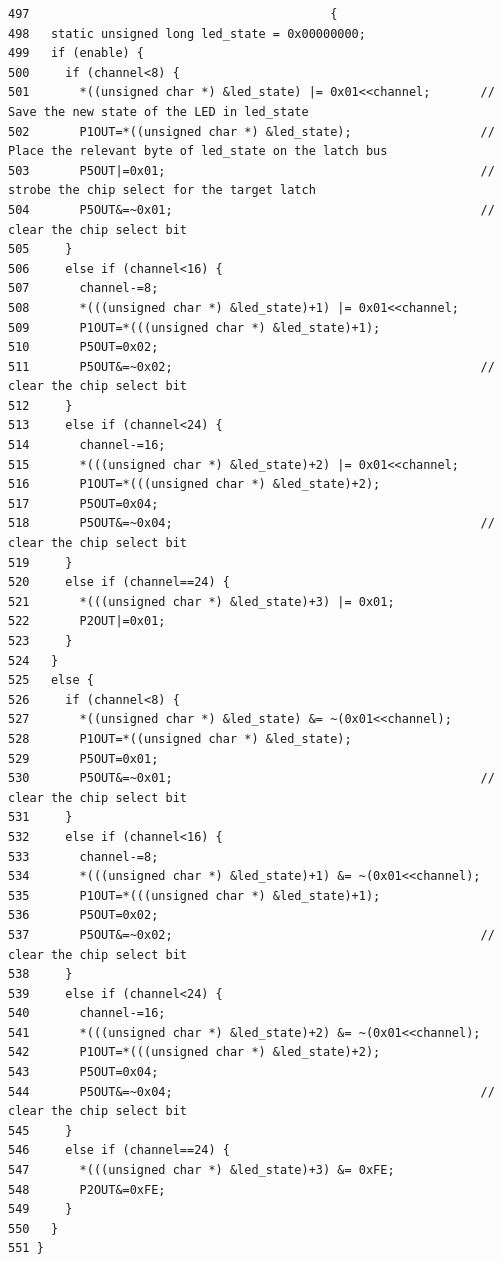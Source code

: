 \footnotesize\begin{verbatim}497                                          {
498   static unsigned long led_state = 0x00000000;
499   if (enable) {
500     if (channel<8) {
501       *((unsigned char *) &led_state) |= 0x01<<channel;       // Save the new state of the LED in led_state
502       P1OUT=*((unsigned char *) &led_state);                  // Place the relevant byte of led_state on the latch bus 
503       P5OUT|=0x01;                                            // strobe the chip select for the target latch
504       P5OUT&=~0x01;                                           // clear the chip select bit
505     }
506     else if (channel<16) {
507       channel-=8;
508       *(((unsigned char *) &led_state)+1) |= 0x01<<channel;  
509       P1OUT=*(((unsigned char *) &led_state)+1);  
510       P5OUT=0x02;
511       P5OUT&=~0x02;                                           // clear the chip select bit
512     }
513     else if (channel<24) {
514       channel-=16;
515       *(((unsigned char *) &led_state)+2) |= 0x01<<channel;  
516       P1OUT=*(((unsigned char *) &led_state)+2);  
517       P5OUT=0x04;
518       P5OUT&=~0x04;                                           // clear the chip select bit
519     }
520     else if (channel==24) {
521       *(((unsigned char *) &led_state)+3) |= 0x01;  
522       P2OUT|=0x01;
523     }
524   }
525   else {
526     if (channel<8) {
527       *((unsigned char *) &led_state) &= ~(0x01<<channel);  
528       P1OUT=*((unsigned char *) &led_state);  
529       P5OUT=0x01;
530       P5OUT&=~0x01;                                           // clear the chip select bit
531     }
532     else if (channel<16) {
533       channel-=8;
534       *(((unsigned char *) &led_state)+1) &= ~(0x01<<channel);  
535       P1OUT=*(((unsigned char *) &led_state)+1);  
536       P5OUT=0x02;
537       P5OUT&=~0x02;                                           // clear the chip select bit
538     }
539     else if (channel<24) {
540       channel-=16;
541       *(((unsigned char *) &led_state)+2) &= ~(0x01<<channel);  
542       P1OUT=*(((unsigned char *) &led_state)+2);  
543       P5OUT=0x04;
544       P5OUT&=~0x04;                                           // clear the chip select bit
545     }
546     else if (channel==24) {
547       *(((unsigned char *) &led_state)+3) &= 0xFE;  
548       P2OUT&=0xFE;
549     }
550   }
551 }
\end{verbatim}\normalsize 


